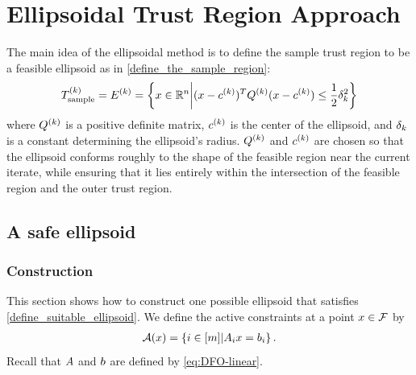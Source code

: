 \documentclass{article}
\begin{document}


\section{Ellipsoidal Trust Region Approach}\label{sec:ellipsoidal}

The main idea of the ellipsoidal method is to define the sample trust region to be a feasible ellipsoid as in \cref{define_the_sample_region}:
\begin{align*}
{T_{\text{sample}}^{(k)}} = {E^{(k)}} = \left\{x \in \mathbb R^n \bigg | (x - c^{(k)})^T {Q^{(k)}} (x - c^{(k)}) \le \frac 1 2 \delta_k^2 \right\}
\end{align*}
where ${Q^{(k)}}$ is a positive definite matrix, $c^{(k)}$ is the center of the ellipsoid, and $\delta_k$ is a constant determining the ellipsoid's radius.   
${Q^{(k)}}$ and $c^{(k)}$ are chosen so that the ellipsoid conforms roughly to the shape of the feasible region near the current iterate, 
while ensuring that it lies entirely within the intersection of the feasible region and the outer trust region.



\subsection{A safe ellipsoid}

\subsubsection{Construction}
\label{the_safe_ellipsoid}

This section shows how to construct one possible ellipsoid that satisfies \cref{define_suitable_ellipsoid}.
We define the active constraints at a point $x \in {\mathcal F}$ by
\begin{align}
{\mathcal A}(x) = \left\{i \in [m] | {{A}}_ix = {{b}}_i \right\}. \label{define_activei}
\end{align}
Recall that ${A}$ and ${b}$ are defined by \cref{eq:DFO-linear}.
\end{document}
